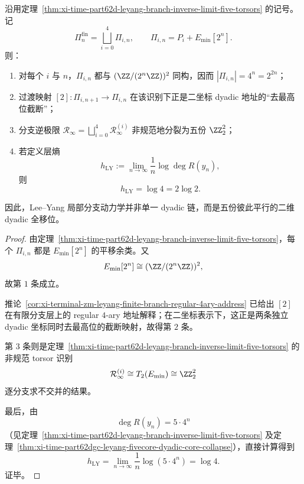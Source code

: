 \begin{corollary}\label{cor:xi-time-part9zp-leyang-five-two-dimensional-fullshifts}
沿用定理~\ref{thm:xi-time-part62d-leyang-branch-inverse-limit-five-torsors} 的记号。记
\[
\Pi_n^{\mathrm{fin}}
=
\bigsqcup_{i=0}^{4}\Pi_{i,n},
\qquad
\Pi_{i,n}=P_i+E_{\min}[2^n].
\]
则：
\begin{enumerate}
  \item 对每个 \(i\) 与 \(n\)，\(\Pi_{i,n}\) 都与 \((\ZZ/(2^n\ZZ))^{2}\) 同构，因而 \(|\Pi_{i,n}|=4^n=2^{2n}\)；
  \item 过渡映射 \([2]:\Pi_{i,n+1}\to \Pi_{i,n}\) 在该识别下正是二坐标 dyadic 地址的“去最高位截断”；
  \item 分支逆极限 \(\mathcal R_\infty=\bigsqcup_{i=0}^{4}\mathcal R_\infty^{(i)}\) 非规范地分裂为五份 \(\ZZ_2^2\)；
  \item 若定义层熵
  \[
  h_{\mathrm{LY}}
  :=
  \lim_{n\to\infty}\frac1n\log \deg R(y_n),
  \]
  则
  \[
  h_{\mathrm{LY}}=\log 4=2\log 2.
  \]
\end{enumerate}
因此，Lee--Yang 局部分支动力学并非单一 dyadic 链，而是五份彼此平行的二维 dyadic 全移位。
\end{corollary}
\begin{proof}
由定理~\ref{thm:xi-time-part62d-leyang-branch-inverse-limit-five-torsors}，每个 \(\Pi_{i,n}\) 都是 \(E_{\min}[2^n]\) 的平移余类。又
\[
E_{\min}[2^n]\cong (\ZZ/(2^n\ZZ))^{2},
\]
故第 \(1\) 条成立。

推论~\ref{cor:xi-terminal-zm-leyang-finite-branch-regular-4ary-address} 已给出 \([2]\) 在有限分支层上的 regular \(4\)-ary 地址解释；在二坐标表示下，这正是两条独立 dyadic 坐标同时去最高位的截断映射，故得第 \(2\) 条。

第 \(3\) 条则是定理~\ref{thm:xi-time-part62d-leyang-branch-inverse-limit-five-torsors} 的非规范 torsor 识别
\[
\mathcal R_\infty^{(i)}\cong T_2(E_{\min})\cong \ZZ_2^2
\]
逐分支求不交并的结果。

最后，由
\[
\deg R(y_n)=5\cdot 4^n
\]
（见定理~\ref{thm:xi-time-part62d-leyang-branch-inverse-limit-five-torsors} 及定理~\ref{thm:xi-time-part62dgc-leyang-fivecore-dyadic-core-collapse}），直接计算得到
\[
h_{\mathrm{LY}}
=
\lim_{n\to\infty}\frac1n\log(5\cdot 4^n)
=
\log 4.
\]
证毕。
\end{proof}

